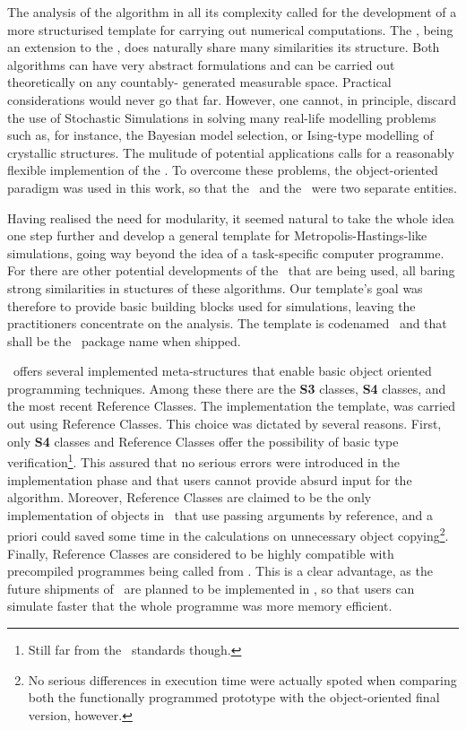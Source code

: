 The analysis of the algorithm in all its complexity called for the development
of a more structurised template for carrying out numerical computations. The
\PTalgo, being an extension to the \MHalgo, does naturally share many similarities its structure. Both algorithms can have very
abstract formulations and can be carried out theoretically on any countably-
generated measurable space. Practical considerations would never go that far.
However, one cannot, in principle, discard the use of Stochastic Simulations in solving many real-life modelling problems such as, for instance, the Bayesian model selection, or Ising-type modelling of crystallic structures. The mulitude of potential applications calls for a reasonably flexible implemention of the \PTalgo. To overcome these problems, the object-oriented paradigm was used in this work, so that the \sspace\, and the \algo\, were two separate entities. 

Having realised the need for modularity, it seemed natural to take the whole idea one step further and develop a general template for Metropolis-Hastings-like simulations, going way beyond the idea of a task-specific computer programme. For there are other potential developments of the \MHalgo\, that are being used, all baring strong similarities in stuctures of these algorithms. Our template's goal was therefore to provide basic building blocks used for simulations, leaving the practitioners concentrate on the analysis. The template is codenamed \ssimul \, and that shall be the \RR\, package name when shipped.


\RR\, offers several implemented meta-structures that enable basic object oriented programming techniques. Among these there are the \textbf{S3} classes, \textbf{S4} classes, and the most recent Reference Classes. The implementation the template, was carried out using Reference Classes. This choice was dictated by several reasons. First, only \textbf{S4} classes and Reference Classes offer the possibility of basic type verification\footnote{Still far from the \Cpp\, standards though.}. This assured that no serious errors were introduced in the implementation phase and that users cannot provide absurd input for the algorithm. Moreover, Reference Classes are claimed to be the only implementation of objects in \RR\, that use passing arguments by reference, and a priori could saved some time in the calculations on unnecessary object copying\footnote{No serious differences in execution time were actually spoted when comparing both the functionally programmed prototype with the object-oriented final version, however.}. Finally, Reference Classes are considered to be highly compatible with \Cpp\, precompiled programmes being called from \RR. This is a clear advantage, as the future shipments of \ssimul\, are planned to be implemented in \Cpp, so that users can simulate faster that the whole programme was more memory efficient.   

